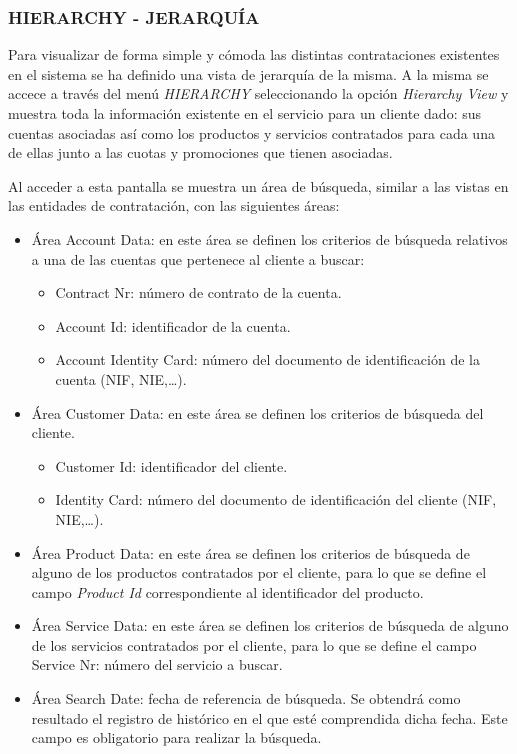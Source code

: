 \subsubsection{HIERARCHY - JERARQUÍA}

Para visualizar de forma simple y cómoda las distintas contrataciones existentes en el sistema se ha definido una vista de jerarquía de la misma. A la misma se accece a través del menú \emph{HIERARCHY} seleccionando la opción \emph{Hierarchy View} y muestra toda la información existente en el servicio para un cliente dado: sus cuentas asociadas así como los productos y servicios contratados para cada una de ellas junto a las cuotas y promociones que tienen asociadas.

Al acceder a esta pantalla se muestra un área de búsqueda, similar a las vistas en las entidades de contratación, con las siguientes áreas:

\begin{itemize}
	\item Área Account Data: en este área se definen los criterios de búsqueda relativos a una de las cuentas que pertenece al cliente a buscar:
		\begin{itemize}
			\item Contract Nr: número de contrato de la cuenta.
			\item Account Id: identificador de la cuenta.
			\item Account Identity Card: número del documento de identificación de la cuenta (NIF, NIE,\dots).
		\end{itemize}
	\item Área Customer Data: en este área se definen los criterios de búsqueda del cliente.
		\begin{itemize}
			\item Customer Id: identificador del cliente.
			\item Identity Card: número del documento de identificación del cliente (NIF, NIE,\dots).
		\end{itemize}
	\item Área Product Data: en este área se definen los criterios de búsqueda de alguno de los productos contratados por el cliente, para lo que se define el campo \emph{Product Id} correspondiente al identificador del producto.
	\item Área Service Data: en este área se definen los criterios de búsqueda de alguno de los servicios contratados por el cliente, para lo que se define el campo Service Nr: número del servicio a buscar.
	\item Área Search Date: fecha de referencia de búsqueda. Se obtendrá como resultado el registro de histórico en el que esté comprendida dicha fecha. Este campo es obligatorio para realizar la búsqueda.
\end{itemize}

